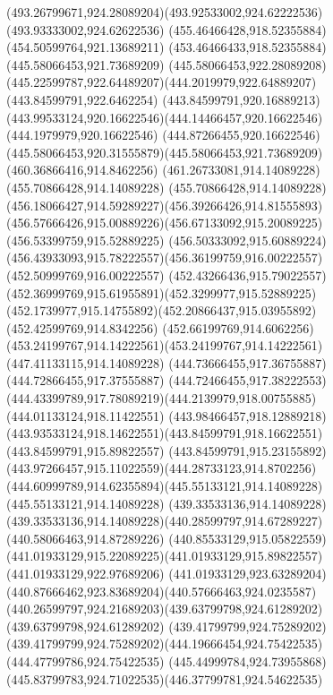 {{{{				\curveto(493.26799671,924.28089204)(493.92533002,924.62222536)(493.93333002,924.62622536)
				\closepath
				\moveto(455.46466428,918.52355884)
				\lineto(454.50599764,921.13689211)
				\lineto(453.46466433,918.52355884)
				\closepath
				\moveto(445.58066453,921.73689209)
				\curveto(445.58066453,922.28089208)(445.22599787,922.64489207)(444.2019979,922.64889207)
				\lineto(443.84599791,922.6462254)
				\lineto(443.84599791,920.16889213)
				\curveto(443.99533124,920.16622546)(444.14466457,920.16622546)(444.1979979,920.16622546)
				\curveto(444.87266455,920.16622546)(445.58066453,920.31555879)(445.58066453,921.73689209)
				\moveto(460.36866416,914.8462256)
				\lineto(461.26733081,914.14089228)
				\lineto(455.70866428,914.14089228)
				\curveto(455.70866428,914.14089228)(456.18066427,914.59289227)(456.39266426,914.81555893)
				\curveto(456.57666426,915.00889226)(456.67133092,915.20089225)(456.53399759,915.52889225)
				\curveto(456.50333092,915.60889224)(456.43933093,915.78222557)(456.36199759,916.00222557)
				\lineto(452.50999769,916.00222557)
				\curveto(452.43266436,915.79022557)(452.36999769,915.61955891)(452.3299977,915.52889225)
				\curveto(452.1739977,915.14755892)(452.20866437,915.03955892)(452.42599769,914.8342256)
				\curveto(452.66199769,914.6062256)(453.24199767,914.14222561)(453.24199767,914.14222561)
				\lineto(447.41133115,914.14089228)
				\lineto(444.73666455,917.36755887)
				\lineto(444.72866455,917.37555887)
				\lineto(444.72466455,917.38222553)
				\curveto(444.43399789,917.78089219)(444.2139979,918.00755885)(444.01133124,918.11422551)
				\curveto(443.98466457,918.12889218)(443.93533124,918.14622551)(443.84599791,918.16622551)
				\lineto(443.84599791,915.89822557)
				\curveto(443.84599791,915.23155892)(443.97266457,915.11022559)(444.28733123,914.8702256)
				\curveto(444.60999789,914.62355894)(445.55133121,914.14089228)(445.55133121,914.14089228)
				\lineto(439.33533136,914.14089228)
				\curveto(439.33533136,914.14089228)(440.28599797,914.67289227)(440.58066463,914.87289226)
				\curveto(440.85533129,915.05822559)(441.01933129,915.22089225)(441.01933129,915.89822557)
				\lineto(441.01933129,922.97689206)
				\curveto(441.01933129,923.63289204)(440.87666462,923.83689204)(440.57666463,924.0235587)
				\curveto(440.26599797,924.21689203)(439.63799798,924.61289202)(439.63799798,924.61289202)
				\lineto(439.41799799,924.75289202)
				\curveto(439.41799799,924.75289202)(444.19666454,924.75422535)(444.47799786,924.75422535)
				\curveto(445.44999784,924.73955868)(445.83799783,924.71022535)(446.37799781,924.54622535)
}}}}

